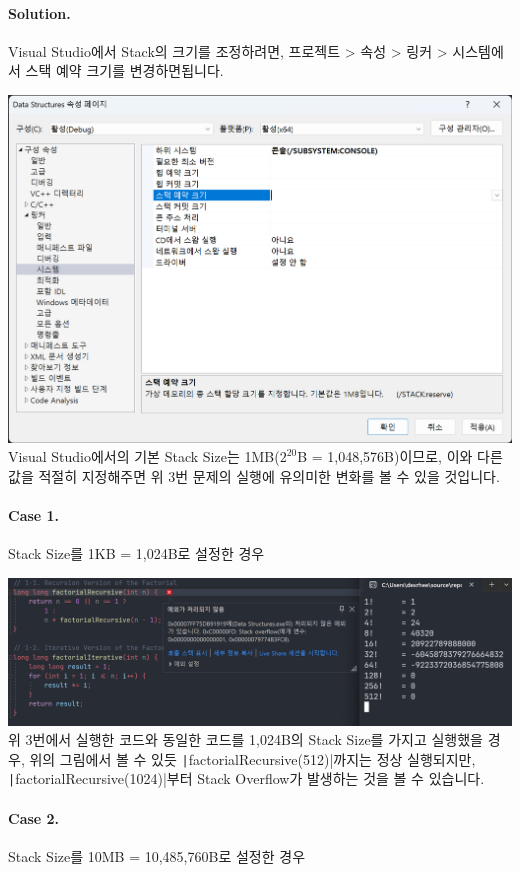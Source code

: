 \paragraph{Solution.}
Visual Studio에서 Stack의 크기를 조정하려면, 프로젝트 > 속성 > 링커 > 시스템에서 스택 예약 크기를 변경하면됩니다.

\includegraphics[width=\textwidth]{./img/5-1.png}
Visual Studio에서의 기본 Stack Size는 1MB($2^20$B = 1,048,576B)이므로, 이와 다른 값을 적절히 지정해주면 위 3번 문제의 실행에 유의미한 변화를 볼 수 있을 것입니다.

\paragraph{Case 1.} Stack Size를 1KB = 1,024B로 설정한 경우

\includegraphics[width=\textwidth]{./img/5-2.png}
위 3번에서 실행한 코드와 동일한 코드를 1,024B의 Stack Size를 가지고 실행했을 경우,
위의 그림에서 볼 수 있듯 \texttt|factorialRecursive(512)|까지는 정상 실행되지만,
\texttt|factorialRecursive(1024)|부터 Stack Overflow가 발생하는 것을 볼 수 있습니다.

\paragraph{Case 2.} Stack Size를 10MB = 10,485,760B로 설정한 경우

